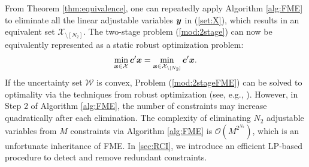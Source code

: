 \documentclass[fleqn,mnsc,blindrev]{informs4}
\newcommand{\mb}[1]{\mbox{\boldmath \ensuremath{#1}}}
\begin{document}
	
	From Theorem \ref{thm:equivalence}, one can repeatedly apply Algorithm \ref{alg:FME} to eliminate all the linear adjustable variables $\mb{y}$ in (\ref{set:X}), which results in an equivalent set $\mathcal{X}_{\setminus [N_2]}$. The two-stage  problem (\ref{mod:2stage}) can now be equivalently represented as a static robust optimization problem:
\begin{equation}
		\label{mod:2stageFME}
		\min_{\boldsymbol{x} \in \mathcal{X}} \mb{c}'\mb{x} = \min_{\boldsymbol{x} \in \mathcal{X}_{\setminus [N_2]}} \mb{c}'\mb{x}.
\end{equation}
	If the uncertainty set $\mathcal{W}$ is convex,  Problem (\ref{mod:2stageFME}) can be solved to optimality via the techniques from robust optimization (see, e.g., \cite{mb09,bdv15,gbbd14}).  However, in Step 2 of Algorithm \ref{alg:FME}, the number of constraints may increase quadratically after each elimination. The complexity of eliminating $N_2$ adjustable variables from $M$ constraints via Algorithm \ref{alg:FME} is $\mathcal{O}(M^{2^{N_2}})$, which is an unfortunate inheritance of FME. In \textsection \ref{sec:RCI}, we introduce an efficient LP-based procedure to detect and remove redundant constraints.
	
\end{document}

